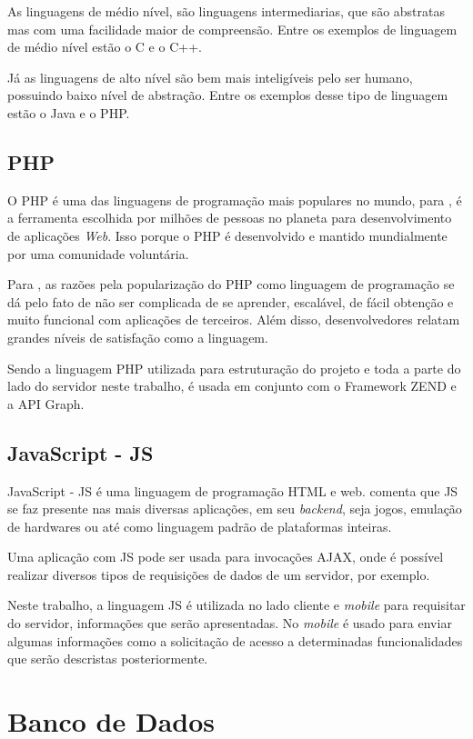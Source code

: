 As linguagens de médio nível, são linguagens intermediarias, que são abstratas mas com uma facilidade maior de compreensão. Entre os exemplos de linguagem de médio nível estão o C e o C++.

Já as linguagens de alto nível são bem mais inteligíveis pelo ser humano, possuindo baixo nível de abstração. Entre os exemplos desse tipo de linguagem estão o Java e o PHP.

\subsection{PHP}
O PHP é uma das linguagens de programação mais populares no mundo, para \cite[p.2]{vaswani2010}, é a ferramenta  escolhida por milhões de pessoas no planeta para desenvolvimento de aplicações \textit{Web}. Isso porque o PHP é desenvolvido e mantido mundialmente por uma comunidade voluntária. 

Para \cite[p.2]{vaswani2010}, as razões pela popularização do PHP como linguagem de programação se dá pelo fato de não ser complicada de se aprender, escalável, de fácil obtenção e muito funcional com aplicações de terceiros. Além disso, desenvolvedores relatam grandes níveis de satisfação como a linguagem.

Sendo a linguagem PHP utilizada para estruturação do projeto e toda a parte do lado do servidor neste trabalho, é usada em conjunto com o Framework ZEND e a API Graph. 

\subsection{JavaScript - JS}
JavaScript - JS é uma linguagem de programação HTML e web. \cite{balduino2014} comenta que JS se faz presente nas mais diversas aplicações, em seu \textit{backend}, seja jogos, emulação de hardwares ou até como linguagem padrão de plataformas inteiras.

Uma aplicação com JS pode ser usada para invocações AJAX, onde é possível realizar diversos tipos de requisições de dados de um servidor, por exemplo. 

Neste trabalho, a linguagem JS é utilizada no lado cliente e \textit{mobile} para requisitar do servidor, informações que serão apresentadas. No \textit{mobile} é usado para enviar algumas informações como a solicitação de acesso a determinadas funcionalidades que serão descristas posteriormente.

\section{Banco de Dados}

